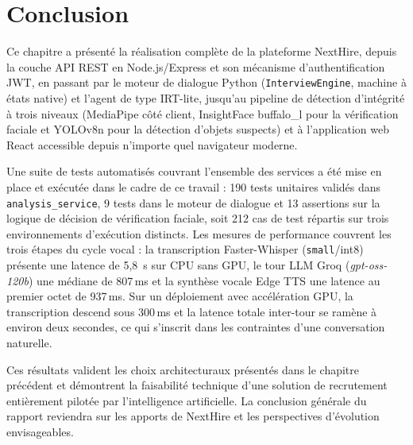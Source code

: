 \section{Conclusion}

Ce chapitre a présenté la réalisation complète de la plateforme NextHire, depuis la couche
API REST en Node.js/Express et son mécanisme d'authentification JWT, en passant par le moteur
de dialogue Python (\texttt{InterviewEngine}, machine à états native) et l'agent de type IRT-lite, jusqu'au pipeline de
détection d'intégrité à trois niveaux (MediaPipe côté client, InsightFace buffalo\_l pour la
vérification faciale et YOLOv8n pour la détection d'objets suspects) et à l'application web
React accessible depuis n'importe quel navigateur moderne.

Une suite de tests automatisés couvrant l'ensemble des services a été mise en place et
exécutée dans le cadre de ce travail : 190 tests unitaires validés dans \texttt{analysis\_service},
9 tests dans le moteur de dialogue et 13 assertions sur la logique de décision de vérification
faciale, soit 212 cas de test répartis sur trois environnements d'exécution distincts.
Les mesures de performance couvrent les trois étapes du cycle vocal : la transcription
Faster-Whisper (\texttt{small}/int8) présente une latence de 5,8~s sur CPU sans GPU, le tour
LLM Groq (\textit{gpt-oss-120b}) une médiane de 807\,ms et la synthèse vocale Edge TTS une
latence au premier octet de 937\,ms. Sur un déploiement avec accélération GPU, la transcription
descend sous 300\,ms et la latence totale inter-tour se ramène à environ deux secondes, ce qui
s'inscrit dans les contraintes d'une conversation naturelle.

Ces résultats valident les choix architecturaux présentés dans le chapitre précédent et
démontrent la faisabilité technique d'une solution de recrutement entièrement pilotée par
l'intelligence artificielle. La conclusion générale du rapport reviendra sur les apports de
NextHire et les perspectives d'évolution envisageables.